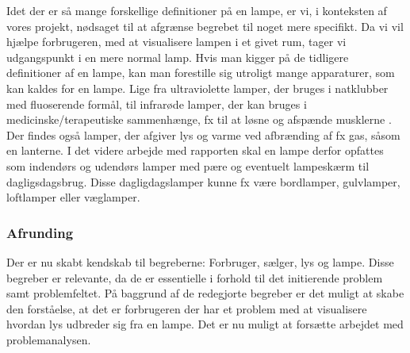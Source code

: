 Idet der er så mange forskellige definitioner på en lampe, er vi, i konteksten af vores projekt, nødsaget til at afgrænse begrebet til noget mere specifikt. Da vi vil hjælpe forbrugeren, med at visualisere lampen i et givet rum, tager vi udgangspunkt i en mere normal lamp. Hvis man kigger på de tidligere definitioner af en lampe, kan man forestille sig utroligt mange apparaturer, som kan kaldes for en lampe. Lige fra ultraviolette lamper, der bruges i natklubber med fluoserende formål, til infrarøde lamper, der kan bruges i medicinske/terapeutiske sammenhænge, fx til at løsne og afspænde musklerne \cite{lys_terapi}. Der findes også lamper, der afgiver lys og varme ved afbrænding af fx gas, såsom en lanterne. I det videre arbejde med rapporten skal en lampe derfor opfattes som indendørs og udendørs lamper med pære og eventuelt lampeskærm til dagligsdagsbrug. Disse dagligdagslamper kunne fx være bordlamper, gulvlamper, loftlamper eller væglamper. 

\subsubsection{Afrunding}
Der er nu skabt kendskab til begreberne: Forbruger, sælger, lys og lampe. Disse begreber er relevante, da de er essentielle i forhold til det initierende problem samt problemfeltet. På baggrund af de redegjorte begreber er det muligt at skabe den forståelse, at det er forbrugeren der har et problem med at visualisere hvordan lys udbreder sig fra en lampe. Det er nu muligt at forsætte arbejdet med problemanalysen.




